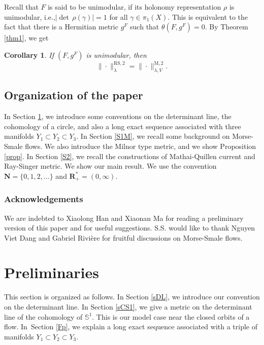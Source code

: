 \documentclass[11pt]{article}
\newcommand{\ie}{i.e.,\xspace}
\numberwithin{equation}{section}
\newcommand{\rM}{\mathrm{M}}
\newcommand{\RS}{\mathrm{RS}}
\theoremstyle{plain}
\newtheorem{cor}[lem]{Corollary}
\theoremstyle{definition}
\theoremstyle{remark}
\newcommand{\bN}{\mathbf{N}}
\newcommand{\bR}{\mathbf{R}}
\newcommand{\bbS}{\mathbb{S}}
\begin{document}
Recall that $F$ is said to be unimodular, if its holonomy representation
$\rho$ is unimodular, \ie $|{\det\,} \rho(\gamma)|= 1$ for all
$\gamma\in \pi_{1}(X)$. This is
equivalent to the fact that there is a Hermitian metric $g^{F}$
such that $\theta(F,g^{F})=0.$
By Theorem \ref{thm1}, we get
\begin{cor}
If $(F,g^{F})$ is unimodular, then
\begin{equation*}
\|{\cdot}\|^{\RS,2}_{\lambda}=\|{\cdot}\|^{\rM,2}_{\lambda,V}.
\end{equation*}
\end{cor}

\subsection{Organization of the paper}
In Section \ref{Sp1}, we
introduce some conventions on the determinant line, the cohomology
of a circle, and also a long exact sequence associated with three manifolds $Y_{1}\subset Y_{2}\subset Y_{3}$. In Section \ref{S1M}, we recall some background on Morse-Smale
flows. We also introduce the Milnor type metric, and we show Proposition
\ref{prop}. In
Section \ref{S2}, we recall the constructions of Mathai-Quillen
current and Ray-Singer metric. We show our main result.
We use the convention $\bN=\{0,1,2,\ldots\}$ and $\bR_{+}^{*}=(0,\infty)$.

\subsubsection*{Acknowledgements}
We are indebted to Xiaolong Han and Xiaonan Ma for reading a preliminary version of this paper and for useful suggestions. S.S. would like to thank Nguyen Viet Dang and Gabriel Rivière for
fruitful discussions on Morse-Smale flows.

\section{Preliminaries} \label{Sp1}
This section is organized as follows. In Section \ref{sDL}, we
introduce our convention on the determinant line. In Section
\ref{sCS1}, we give a metric on the determinant line of the
cohomology of $\bbS^{1}$. This is our model case near the
closed orbits of a flow. In~Section \ref{Fp}, we explain a long exact
sequence associated with a triple of manifolds $Y_{1}\subset
Y_{2}\subset Y_{3}$.
\end{document}
